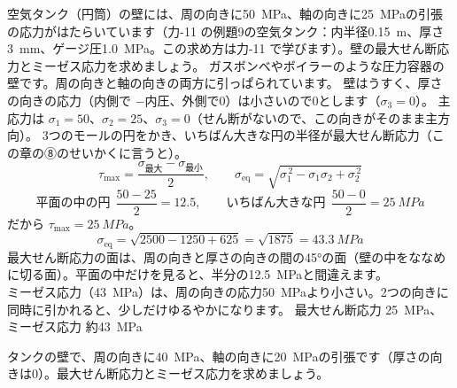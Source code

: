 \begin{phreidai}[圧力タンクの壁の最大せん断応力]
\label{ph:力-9:ex8}空気タンク（円筒）の壁には、周の向きに\qty{50}{MPa}、軸の向きに\qty{25}{MPa}の引張の応力がはたらいています（力-11 の例題9の空気タンク：内半径\qty{0.15}{m}、厚さ\qty{3}{mm}、ゲージ圧\qty{1.0}{MPa}。この求め方は力-11 で学びます）。壁の最大せん断応力とミーゼス応力を求めましょう。
\phbamen
ガスボンベやボイラーのような圧力容器の壁です。周の向きと軸の向きの両方に引っぱられています。
\phmushi
壁はうすく、厚さの向きの応力（内側で $-$内圧、外側で0）は小さいので0とします（$\sigma_3=0$）。
\phzu
主応力は $\sigma_1=50$、$\sigma_2=25$、$\sigma_3=0$（せん断がないので、この向きがそのまま主方向）。
\phriyu
3つのモールの円をかき、いちばん大きな円の半径が最大せん断応力（この章の⑧のせいかくに言うと）。
\phtateru
\[\tau_{\max}=\frac{\sigma_{\text{最大}}-\sigma_{\text{最小}}}{2},\qquad\sigma_{\mathrm{eq}}=\sqrt{\sigma_1^{\,2}-\sigma_1\sigma_2+\sigma_2^{\,2}}\]
\phtoku
\[\text{平面の中の円}\ \ \frac{50-25}{2}=12.5,\qquad\text{いちばん大きな円}\ \ \frac{50-0}{2}=\qty{25}{MPa}\]
だから $\tau_{\max}=\qty{25}{MPa}$。
\[\sigma_{\mathrm{eq}}=\sqrt{2500-1250+625}=\sqrt{1875}=\qty{43.3}{MPa}\]
\phtashikame
最大せん断応力の面は、周の向きと厚さの向きの間の45°の面（壁の中をななめに切る面）。平面の中だけを見ると、半分の\qty{12.5}{MPa}と間違えます。\\
ミーゼス応力（\qty{43}{MPa}）は、周の向きの応力\qty{50}{MPa}より小さい。2つの向きに同時に引かれると、少しだけゆるやかになります。
\kotae 最大せん断応力 \qty{25}{MPa}、ミーゼス応力 約\qty{43}{MPa}
\end{phreidai}
\begin{jibun}
タンクの壁で、周の向きに\qty{40}{MPa}、軸の向きに\qty{20}{MPa}の引張です（厚さの向きは0）。最大せん断応力とミーゼス応力を求めましょう。
\end{jibun}

